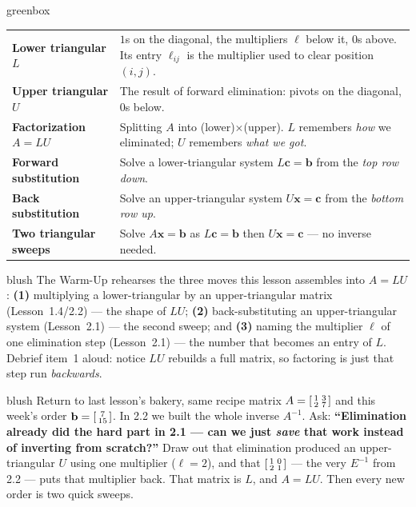 \documentclass[10pt]{article}
\newcommand{\xx}{\mathbf{x}}
\newcommand{\bb}{\mathbf{b}}
\newcommand{\cc}{\mathbf{c}}
\begin{document}
\begin{skillbox}{greenbox}
\renewcommand{\arraystretch}{1.3}
\begin{tabularx}{\linewidth}{@{}l X@{}}
\textbf{Lower triangular $L$} & $1$s on the diagonal, the multipliers $\ell$ below it, $0$s above. Its entry $\ell_{ij}$ is the multiplier used to clear position $(i,j)$. \\
\textbf{Upper triangular $U$} & The result of forward elimination: pivots on the diagonal, $0$s below. \\
\textbf{Factorization $A=LU$} & Splitting $A$ into (lower)$\times$(upper). $L$ remembers \emph{how} we eliminated; $U$ remembers \emph{what we got}. \\
\textbf{Forward substitution} & Solve a lower-triangular system $L\cc=\bb$ from the \emph{top row down}. \\
\textbf{Back substitution} & Solve an upper-triangular system $U\xx=\cc$ from the \emph{bottom row up}. \\
\textbf{Two triangular sweeps} & Solve $A\xx=\bb$ as $L\cc=\bb$ then $U\xx=\cc$ --- no inverse needed. \\
\end{tabularx}
\end{skillbox}

\begin{fixedskillbox}{blush}
    The Warm-Up rehearses the three moves this lesson assembles into $A=LU$:
    \textbf{(1)} multiplying a lower-triangular by an upper-triangular matrix (Lesson~1.4/2.2) --- the
    shape of $LU$; \textbf{(2)} back-substituting an upper-triangular system (Lesson~2.1) --- the
    second sweep; and \textbf{(3)} naming the multiplier $\ell$ of one elimination step (Lesson~2.1)
    --- the number that becomes an entry of $L$. Debrief item~1 aloud: notice $LU$ rebuilds a full
    matrix, so factoring is just that step run \emph{backwards}.
\end{fixedskillbox}

\begin{skillbox}[Hook]{blush}
    Return to last lesson's bakery, same recipe matrix $A=\begin{bsmallmatrix} 1&3\\2&7 \end{bsmallmatrix}$
    and this week's order $\bb=\begin{bsmallmatrix} 7\\15 \end{bsmallmatrix}$. In 2.2 we built the whole
    inverse $A^{-1}$. Ask: \textbf{``Elimination already did the hard part in 2.1 --- can we just
    \emph{save} that work instead of inverting from scratch?''} Draw out that elimination produced an
    upper-triangular $U$ using one multiplier ($\ell=2$), and that $\begin{bsmallmatrix} 1&0\\2&1 \end{bsmallmatrix}$
    --- the very $E^{-1}$ from 2.2 --- puts that multiplier back. That matrix is $L$, and $A=LU$. Then
    every new order is two quick sweeps.
\end{skillbox}
\end{document}
